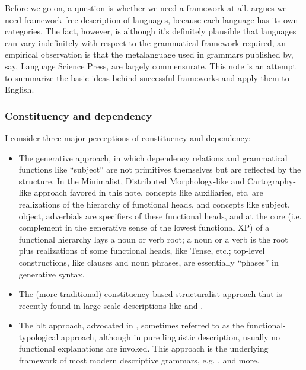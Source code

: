 \documentclass[UTF8, a4paper, oneside, scheme=plain, 12pt]{ctexbook}
\begin{document}
{Before we go on, a question is whether we need a framework at all.
\citet{frameworkfree} argues we need framework-free description of languages,
because each language has its own categories.
The fact, however, is although it's definitely plausible that 
languages can vary indefinitely with respect to 
the grammatical framework required, 
an empirical observation is 
that the metalanguage used in grammars published by, say, Language Science Press, 
are largely commensurate.
This note is an attempt to summarize the basic ideas behind  
successful frameworks and apply them to English.

\subsubsection{Constituency and dependency}

I consider three major perceptions of constituency and dependency:
\begin{itemize}
    \item The generative approach, 
        in which dependency relations and grammatical functions 
        like ``subject'' are not primitives themselves 
        but are reflected by the structure.
        In the Minimalist, Distributed Morphology-like
        and Cartography-like approach favored in this note, 
        concepts like auxiliaries, etc. are realizations of 
        the hierarchy of functional heads, 
        and concepts like subject, object, adverbials are 
        specifiers of these functional heads, 
        and at the core (i.e. complement in the generative sense of the lowest functional XP) 
        of a functional hierarchy lays 
        a noun or verb root; 
        a noun or a verb is the root plus realizations of some functional heads, 
        like Tense, etc.;
        top-level constructions, like clauses and noun phrases, 
        are essentially ``phases'' in generative syntax. 
    \item The (more traditional) constituency-based structuralist approach 
    that is recently found in large-scale descriptions like  
    \citet{cgel} and \citet{abeille2021grande}.
    \item The \ac{blt} approach, advocated in \citet{dixon2009basic1,dixon2010basic2,dixon2012basic3},
        sometimes referred to as the functional-typological approach, 
        although in pure linguistic description, 
        usually no functional explanations are invoked.
        This approach is the underlying framework 
        of most modern descriptive grammars, e.g. 
        \citet{jacques2021grammar,Friesen2017,forker2020grammar}, and more. 
\end{itemize}

}
\end{document}
